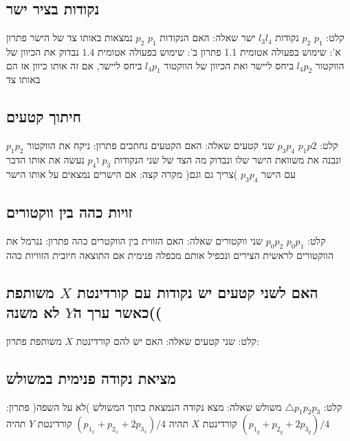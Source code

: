 \documentclass{article}
\makeatletter
\newcommand*{\saved@uline}{}
\let\saved@uline\uline
\newcommand*{\mathuline}{%
  \mathpalette{\math@uline\saved@uline}%
}
\newcommand*{\math@uline}[3]{%
  \mbox{#1{$#2#3\m@th$}}%
}
\renewcommand*{\uline}{%
  \relax  
  \ifmmode
    \expandafter\mathuline
  \else
    \expandafter\saved@uline
  \fi
}
\makeatother
\begin{document}
\subsection{נקודות בציר ישר}
\noindent \uline{קלט:} $p_1$ $p_2$ נקודות $l_3l_4$ ישר
\newline \uline{שאלה:} האם הנקודות $p_1$ $p_2$ נמצאות באותו צד של הישר 
\newline \uline{פתרון א':} שימוש בפעולה אטומית 1.1
\newline \uline{פתרון ב':} שימוש בפעולה אטומית $1.4$ נבדוק את הכיוון של הווקטור $l_4p_2$ ביחס ליישר ואת הכיוון של הווקטור $l_4p_1$ ביחס ליישר, אם זה אותו כיוון אז הם באותו צד

\subsection{חיתוך קטעים}
\noindent \uline{קלט:} $p_1p2$ $p_3p_4$ שני קטעים
\newline \uline{שאלה:} האם הקטעים נחתכים
\newline \uline{פתרון:} ניקח את הווקטור  $p_1p_2$ ונבנה את משוואת הישר שלו ונבדוק מה הצד של שני הנקודות $p_3$ ו$p_4$ נעשה את אותו הדבר עם הישר $p_3p_4$ )צריך גם וגם( 
\newline \uline{מקרה קצה:} אם הישרים נמצאים על אותו הישר 

\subsection{זויות כהה בין ווקטורים}
\noindent \uline{קלט:} $p_0p_1$ $p_0p_2$ שני ווקטורים
\newline \uline{שאלה:} האם הזווית בין הווקטרים כהה
\newline \uline{פתרון:} ננרמל את הווקטורים לראשית הצירים ונכפיל אותם מכפלה פנימית אם התוצאה חיובית הזוויות כהה

\subsection{האם לשני קטעים יש נקודות עם קורדינטת $X$ משותפת )כאשר ערך ה$Y$ לא משנה(}
\noindent \uline{קלט:} שני קטעים
\newline \uline{שאלה:} האם יש להם קורדינטת $X$ משותפת 
\newline \uline{פתרון:}

\subsection{מציאת נקודה פנימית במשולש}
\noindent \uline{קלט:} $\triangle p_1p_2p_3$ משולש
\newline \uline{שאלה:} מצא נקודה הנמצאת בתוך המשולש )לא על השפה(
\newline \uline{פתרון:}  קורדינטת $X$ תהיה $(p_{1_x}+p_{2_x}+2p_{3_x})/4$ קורדינטת $Y$ תהיה $(p_{1_y}+p_{2_y}+2p_{3_y})/4$
\end{document}
